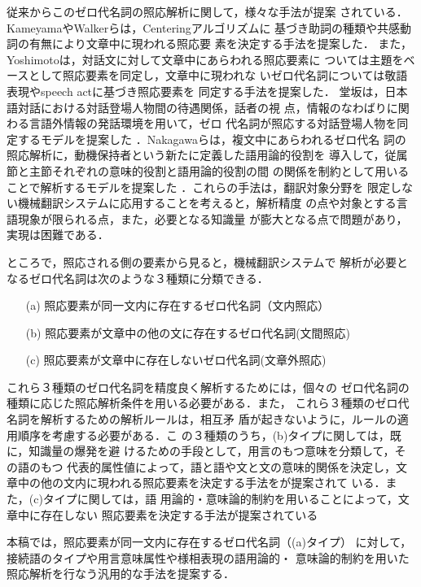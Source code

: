 従来からこのゼロ代名詞の照応解析に関して，様々な手法が提案
されている．KameyamaやWalkerらは，Centeringアルゴリズムに
基づき助詞の種類や共感動詞の有無により文章中に現われる照応要
素を決定する手法を提案した\cite{Kameyama1986,WalkerIidaCote1990}．
また，Yoshimotoは，対話文に対して文章中にあらわれる照応要素に
ついては主題をベースとして照応要素を同定し，文章中に現われな
いゼロ代名詞については敬語表現やspeech actに基づき照応要素を
同定する手法を提案した\cite{Yoshimoto1988}．
堂坂は，日本語対話における対話登場人物間の待遇関係，話者の視
点，情報のなわばりに関わる言語外情報の発話環境を用いて，ゼロ
代名詞が照応する対話登場人物を同定するモデルを提案した
\cite{Dousaka1994}．Nakagawaらは，複文中にあらわれるゼロ代名
詞の照応解析に，動機保持者という新たに定義した語用論的役割を
導入して，従属節と主節それぞれの意味的役割と語用論的役割の間
の関係を制約として用いることで解析するモデルを提案した
\cite{NakagawaNishizawa1994}．これらの手法は，翻訳対象分野を
限定しない機械翻訳システムに応用することを考えると，解析精度
の点や対象とする言語現象が限られる点，また，必要となる知識量
が膨大となる点で問題があり，実現は困難である．

ところで，照応される側の要素から見ると，機械翻訳システムで
解析が必要となるゼロ代名詞は次のような３種類に分類できる．

\begin{enumerate}
\item[(a)] 照応要素が同一文内に存在するゼロ代名詞（文内照応） 
\item[(b)] 照応要素が文章中の他の文に存在するゼロ代名詞(文間照応)
\item[(c)] 照応要素が文章中に存在しないゼロ代名詞(文章外照応)
\end{enumerate}

\noindent
これら３種類のゼロ代名詞を精度良く解析するためには，個々の
ゼロ代名詞の種類に応じた照応解析条件を用いる必要がある．また，
これら３種類のゼロ代名詞を解析するための解析ルールは，相互矛
盾が起きないように，ルールの適用順序を考慮する必要がある．こ
の３種類のうち，(b)タイプに関しては，既に，知識量の爆発を避
けるための手段として，用言のもつ意味を分類して，その語のもつ
代表的属性値によって，語と語や文と文の意味的関係を決定し，文
章中の他の文内に現われる照応要素を決定する手法をが提案されて
いる\cite{NakaiwaIkehara1993}．また，(c)タイプに関しては，語
用論的・意味論的制約を用いることによって，文章中に存在しない
照応要素を決定する手法が提案されている
\cite{NakaiwaShiraiIkehara1994,NakaiwaShiraiIkeharaKawaoka1995}

本稿では，照応要素が同一文内に存在するゼロ代名詞（(a)タイプ）
に対して，接続語のタイプや用言意味属性や様相表現の語用論的・
意味論的制約を用いた照応解析を行なう汎用的な手法を提案する．

